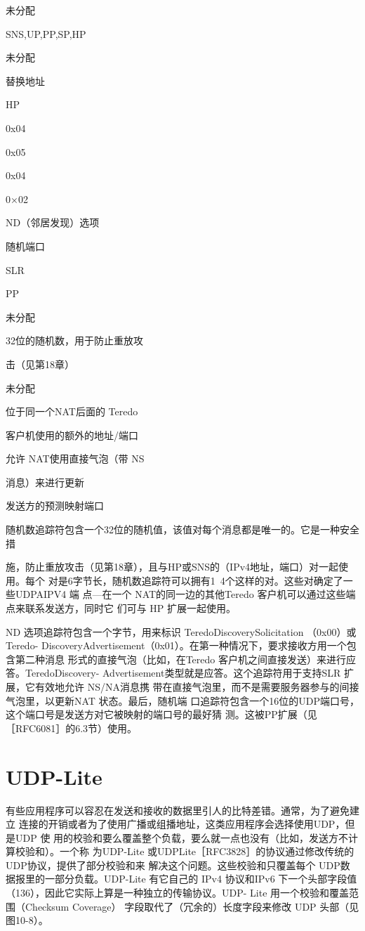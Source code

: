 未分配

SNS,UP,PP,SP,HP

未分配

替换地址

HP

0x04

0x05

0x04

0×02

ND（邻居发现）选项

随机端口

SLR

PP

未分配

32位的随机数，用于防止重放攻

击（见第18章）

未分配

位于同一个NAT后面的 Teredo

客户机使用的额外的地址/端口

允许 NAT使用直接气泡（带 NS

消息）来进行更新

发送方的预测映射端口

随机数追踪符包含一个32位的随机值，该值对每个消息都是唯一的。它是一种安全措

施，防止重放攻击（见第18章），且与HP或SNS的（IPv4地址，端口）对一起使用。每个
对是6字节长，随机数追踪符可以拥有1~4个这样的对。这些对确定了一些UDPAIPV4 端
点—在一个 NAT的同一边的其他Teredo 客户机可以通过这些端点来联系发送方，同时它
们可与 HP 扩展一起使用。


ND 选项追踪符包含一个字节，用来标识 TeredoDiscoverySolicitation （0x00）或 Teredo-
DiscoveryAdvertisement（0x01）。在第一种情况下，要求接收方用一个包含第二种消息
形式的直接气泡（比如，在Teredo 客户机之间直接发送）来进行应答。TeredoDiscovery-
Advertisement类型就是应答。这个追踪符用于支持SLR 扩展，它有效地允许 NS/NA消息携
带在直接气泡里，而不是需要服务器参与的间接气泡里，以更新NAT 状态。最后，随机端
口追踪符包含一个16位的UDP端口号，这个端口号是发送方对它被映射的端口号的最好猜
测。这被PP扩展（见［RFC6081］的6.3节）使用。

\section{UDP-Lite}
有些应用程序可以容忍在发送和接收的数据里引人的比特差错。通常，为了避免建立
连接的开销或者为了使用广播或组播地址，这类应用程序会选择使用UDP，但是UDP 使
用的校验和要么覆盖整个负载，要么就一点也没有（比如，发送方不计算校验和）。一个称
为UDP-Lite 或UDPLite［RFC3828］的协议通过修改传统的UDP协议，提供了部分校验和来
解决这个问题。这些校验和只覆盖每个 UDP数据报里的一部分负载。UDP-Lite 有它自己的
IPv4 协议和IPv6 下一个头部字段值（136），因此它实际上算是一种独立的传输协议。UDP-
Lite 用一个校验和覆盖范围（Checksum Coverage） 字段取代了（冗余的）长度字段来修改
UDP 头部（见图10-8）。

